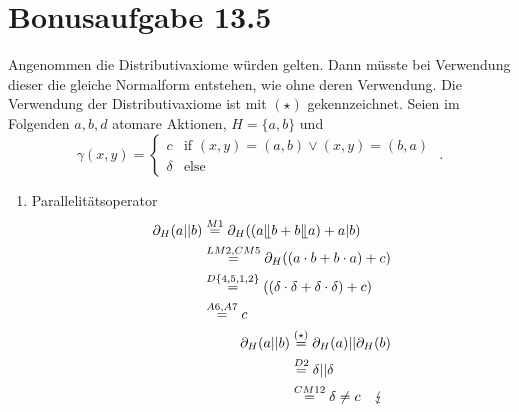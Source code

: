 \documentclass[a4paper]{scrartcl}
\begin{document}
\section*{Bonusaufgabe 13.5} 
Angenommen die Distributivaxiome würden gelten.
Dann müsste bei Verwendung dieser die gleiche Normalform entstehen, wie ohne
deren Verwendung.
Die Verwendung der Distributivaxiome ist mit $(\star)$ gekennzeichnet.
Seien im Folgenden $a, b, d$ atomare Aktionen, $H = \{ a, b \}$ und
\begin{equation}
    \gamma(x,y) =
    \begin{cases}
        c & \text{if } (x,y) = (a,b) \lor (x,y) = (b,a) \\
        \delta & \text{else}
    \end{cases}
    \text{ .}
\end{equation}
\begin{enumerate}
    \item Parallelitätsoperator
        \begin{align}
            \begin{split}
                \partial_H (a||b) &\stackrel{M1}{=} \partial_H ((a \llfloor b + b \llfloor a) + a|b) \\
                &\stackrel{LM2,CM5}{=} \partial_H ((a \cdot b + b \cdot a) + c) \\
                &\stackrel{D\{4,5,1,2\}}{=} ((\delta \cdot \delta + \delta \cdot \delta) + c) \\
                &\stackrel{A6,A7}{=} c
                \label{eq:||}
            \end{split} \\
            \begin{split}
                \partial_H (a||b) &\stackrel{(\star)}{=} \partial_H (a) || \partial_H (b) \\
                &\stackrel{D2}{=} \delta || \delta \\
                &\stackrel{CM12}{=} \delta \neq c \quad \lightning
            \end{split}
        \end{align}


\end{enumerate}
\end{document}
